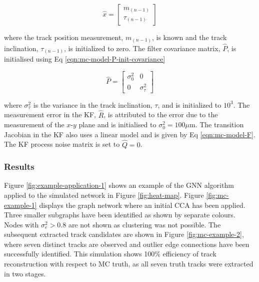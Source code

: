 \begin{equation}
\hat{x} = \begin{bmatrix} m_{(n-1)} \\ \tau_{(n-1)} \end{bmatrix}
\label{eqn:kf-toy-model-x-init}
\end{equation}

where the track position measurement, $m_{(n-1)}$, is known and the track inclination, $\tau_{(n-1)}$, is initialized to zero. The filter covariance matrix, $\hat{P}$, is initialised using Eq \eqref{eqn:mc-model-P-init-covariance}

\begin{equation}
\hat{P} = \begin{bmatrix} \sigma_0^{2} & 0 \\ 0 & \sigma_{\tau}^2 \end{bmatrix}
\label{eqn:mc-model-P-init-covariance}
\end{equation}

where $\sigma_{\tau}^2$ is the variance in the track inclination, $\tau$, and is initialized to $10^3$. The measurement error in the KF, $\hat{R}$, is attributed to the error due to the measurement of the $x$-$y$ plane and is initialised to $\sigma_{0}^{2} = 100\mu$m. The transition Jacobian in the KF also uses a linear model and is given by Eq \eqref{eqn:mc-model-F}. The KF process noise matrix is set to $\hat{Q} = 0$.



\subsubsection{Results}

Figure \ref{fig:example-application-1} shows an example of the GNN algorithm applied to the simulated network in Figure \ref{fig:heat-map}. Figure \ref{fig:mc-example-1} displays the graph network where an initial CCA has been applied. Three smaller subgraphs have been identified as shown by separate colours. Nodes with $\sigma_e^2 > 0.8$ are not shown as clustering was not possible. The subsequent extracted track candidates are shown in Figure \ref{fig:mc-example-2}, where seven distinct tracks are observed and outlier edge connections have been successfully identified. This simulation shows 100\% efficiency of track reconstruction with respect to MC truth, as all seven truth tracks were extracted in two stages. 

